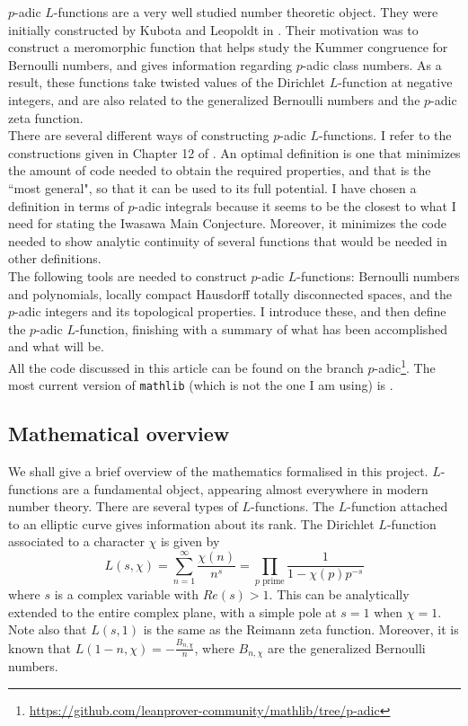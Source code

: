 \documentclass[a4paper,UKenglish,cleveref, autoref, thm-restate]{lipics-v2021}
\newcommand{\lean}[1]{\texttt{#1}\xspace} %
\begin{document}
$p$-adic $L$-functions are a very well studied number theoretic object. They were initially constructed 
by Kubota and Leopoldt in \cite{KL}. Their motivation was to construct a meromorphic function that helps study 
the Kummer congruence for Bernoulli numbers, and gives information regarding $p$-adic class numbers. 
As a result, these functions take twisted values of the Dirichlet $L$-function at negative integers, and 
are also related to the generalized Bernoulli numbers and the $p$-adic zeta function. \\

There are several different ways of constructing $p$-adic $L$-functions. I refer to the constructions
given in Chapter 12 of \cite{cyc}. An optimal definition is one that minimizes the amount of code needed 
to obtain the required properties, and that is the ``most general", so that it can be used to its full 
potential. I have chosen a definition in terms of $p$-adic integrals because it seems to be the
closest to what I need for stating the Iwasawa Main Conjecture. Moreover, it minimizes the
code needed to show analytic continuity of several functions that would be needed in other definitions. \\

The following tools are needed to construct $p$-adic $L$-functions: Bernoulli numbers and polynomials, locally compact Hausdorff totally
disconnected spaces, and the $p$-adic integers and its topological properties.
I introduce these, and then define the $p$-adic $L$-function, finishing with a summary of what has been
accomplished and what will be. \\

All the code discussed in this article can be found on the branch $p$-adic\footnote{\url{https://github.com/leanprover-community/mathlib/tree/p-adic}}. 
The most current version of \lean{mathlib} (which is not the one I am using) is \cite{mathlib}.

\subsection{Mathematical overview}
We shall give a brief overview of the mathematics formalised in this project. 
$L$-functions are a fundamental object, appearing almost everywhere in modern 
number theory. There are several types of $L$-functions. The $L$-function attached 
to an elliptic curve gives information about its rank. The Dirichlet $L$-function 
associated to a character $\chi$ is given by  
$$ L(s, \chi) = \sum_{n = 1}^{\infty} \frac{\chi (n)}{n^s} = \prod_{p \text{ prime}} \frac{1}{1 - \chi (p) p^{-s}}$$
where $s$ is a complex variable with $Re(s) > 1$. This can be analytically extended 
to the entire complex plane, with a simple pole at $s = 1$ when $\chi = 1$. Note also 
that $L(s, 1)$ is the same as the Reimann zeta function. Moreover, it is known that 
$L(1 - n, \chi) = - \frac{B_{n, \chi}}{n}$, where $B_{n, \chi}$ are the generalized 
Bernoulli numbers. \\
\end{document}
